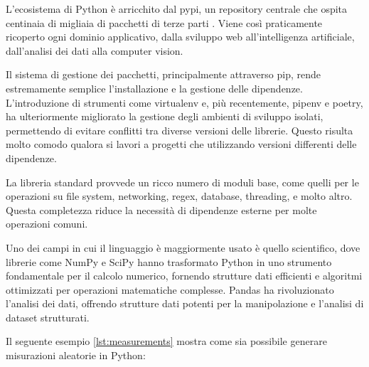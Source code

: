 L'ecosistema di Python è arricchito dal \acrfull{pypi}, un repository centrale che ospita centinaia di migliaia di
pacchetti di terze parti \citep{pypi_2023}. Viene così  praticamente ricoperto ogni dominio applicativo,
dalla sviluppo web all'intelligenza artificiale, dall'analisi dei dati alla computer vision.

Il sistema di gestione dei pacchetti, principalmente attraverso pip, rende estremamente semplice l'installazione e la
gestione delle dipendenze. L'introduzione di strumenti come virtualenv e, più recentemente, pipenv e poetry,
ha ulteriormente migliorato la gestione degli ambienti di sviluppo isolati, permettendo di evitare conflitti
tra diverse versioni delle librerie. Questo risulta molto comodo qualora si lavori a progetti che utilizzando versioni
differenti delle dipendenze.

La libreria standard provvede un ricco numero di moduli base, come quelli per le operazioni su file system, networking,
regex, database, threading, e molto altro. Questa completezza riduce la necessità di dipendenze esterne per molte
operazioni comuni.

Uno dei campi in cui il linguaggio è maggiormente usato è quello scientifico, dove librerie come NumPy e SciPy
hanno trasformato Python in uno strumento fondamentale per il calcolo numerico,
fornendo strutture dati efficienti e algoritmi ottimizzati per operazioni matematiche complesse.
Pandas ha rivoluzionato l'analisi dei dati, offrendo strutture dati potenti per la manipolazione e l'analisi
di dataset strutturati.

Il seguente esempio \ref{lst:measurements} mostra come sia possibile generare misurazioni aleatorie in Python:


